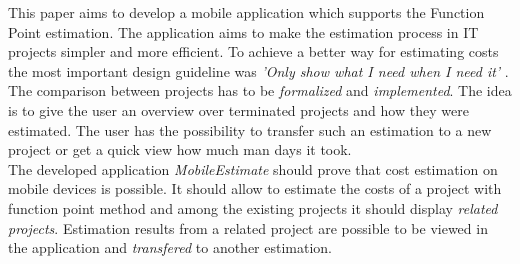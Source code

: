 This paper aims to develop a mobile application which supports the Function Point estimation. The application aims to make the estimation process in IT projects simpler and more efficient. To achieve a better way for estimating costs the most important design guideline was \textit{'Only show what I need when I need it'} \cite{materialdesign}. The comparison between projects has to be \textit{formalized} and \textit{implemented}. The idea is to give the user an overview over terminated projects and how they were estimated. The user has the possibility to transfer such an estimation to a new project or get a quick view how much man days it took.\\
The developed application \textit{MobileEstimate} should prove that cost estimation on mobile devices is possible. It should allow to estimate the costs of a project with function point method and among the existing projects it should display \textit{related projects}. Estimation results from a related project are possible to be viewed in the application and \textit{transfered} to another estimation.\\


